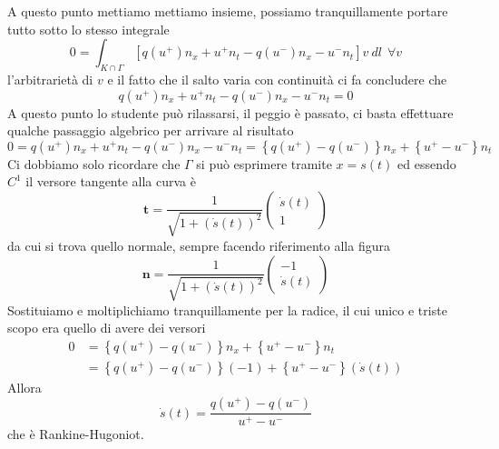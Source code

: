 \documentclass[10pt,a4paper,twoside,openright]{book}
\begin{document}
\begin{dimostrazione}
	A questo punto mettiamo mettiamo insieme, possiamo tranquillamente portare tutto sotto lo stesso integrale
	\begin{equation*}
		0=\int _{K\cap \Gamma }\left[ q\left( u^{+}\right) n_{x} +u^{+} n_{t} -q\left( u^{-}\right) n_{x} -u^{-} n_{t}\right] v\ dl\ \ \forall v
	\end{equation*}
	l'arbitrarietà di $v$ e il fatto che il salto varia con continuità ci fa concludere che
	\begin{equation*}
		q\left( u^{+}\right) n_{x} +u^{+} n_{t} -q\left( u^{-}\right) n_{x} -u^{-} n_{t} =0
	\end{equation*}
	A questo punto lo studente può rilassarsi, il peggio è passato, ci basta effettuare qualche passaggio algebrico per arrivare al risultato
	\begin{equation*}
		0=q\left( u^{+}\right) n_{x} +u^{+} n_{t} -q\left( u^{-}\right) n_{x} -u^{-} n_{t} =\left\{q\left( u^{+}\right) -q\left( u^{-}\right)\right\} n_{x} +\left\{u^{+} -u^{-}\right\} n_{t}
	\end{equation*}
	Ci dobbiamo solo ricordare che $\Gamma $ si può esprimere tramite $x=s( t)$ ed essendo $C^{1}$ il versore tangente alla curva è
	\begin{equation*}
		\mathbf{t} =\frac{1}{\sqrt{1+(\dot{s}( t))^{2}}}
		\begin{pmatrix}
			\dot{s}( t) \\
			1           
		\end{pmatrix}
	\end{equation*}
	da cui si trova quello normale, sempre facendo riferimento alla figura
	\begin{equation*}
		\mathbf{n} =\frac{1}{\sqrt{1+(\dot{s}( t))^{2}}}
		\begin{pmatrix}
			-1          \\
			\dot{s}( t) 
		\end{pmatrix}
	\end{equation*}
	Sostituiamo e moltiplichiamo tranquillamente per la radice, il cui unico e triste scopo era quello di avere dei versori
	\begin{align*}
		0 & =\left\{q\left( u^{+}\right) -q\left( u^{-}\right)\right\} n_{x} +\left\{u^{+} -u^{-}\right\} n_{t}       \\
		  & =\left\{q\left( u^{+}\right) -q\left( u^{-}\right)\right\}( -1) +\left\{u^{+} -u^{-}\right\}(\dot{s}( t)) 
	\end{align*}
	Allora
	\begin{equation*}
		\dot{s}( t) =\frac{q\left( u^{+}\right) -q\left( u^{-}\right)}{u^{+} -u^{-}}
	\end{equation*}
	che è Rankine-Hugoniot.
\end{dimostrazione}
\end{document}
